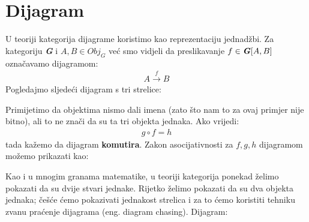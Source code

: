 \documentclass[11pt]{article}
\newcommand{\category}[1]{\textbf{\emph{#1}}}
\theoremstyle{definition}
\begin{document}
  \newpage
  \section{Dijagram}
  U teoriji kategorija dijagrame koristimo kao reprezentaciju jednadžbi.
  Za kategoriju \category{G} i $A, B \in Obj_G$ već smo vidjeli da
  preslikavanje $f \in \category{G}[A, B]$ označavamo dijagramom:
  \begin{align*}
    A \xrightarrow{f} B
  \end{align*}
  Pogledajmo sljedeći dijagram s tri strelice:
  \begin{center}
  \end{center}
  Primijetimo da objektima nismo dali imena (zato što nam to za ovaj primjer nije
  bitno), ali to ne znači da su ta tri objekta jednaka. Ako vrijedi:
  \begin{align*}
    g \circ f = h
  \end{align*}
  tada kažemo da dijagram \textbf{komutira}.
  Zakon asocijativnosti za $f, g, h$ dijagramom možemo prikazati kao:
  \begin{center}
  \end{center}


  Kao i u mnogim granama matematike, u teoriji kategorija ponekad želimo
  pokazati da su dvije stvari jednake. Rijetko želimo pokazati da su dva
  objekta jednaka; češće ćemo pokazivati jednakost strelica i za to ćemo
  koristiti tehniku zvanu praćenje dijagrama (eng. diagram chasing).
  Dijagram:
\end{document}
